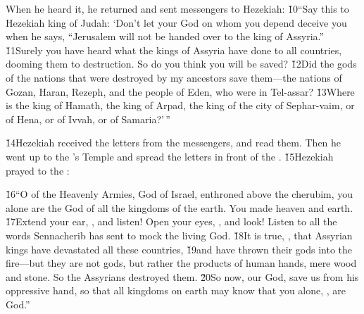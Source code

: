 When he heard it, he returned and sent messengers to Hezekiah: \v{10}``Say this to Hezekiah king of Judah: `Don't let your God on whom you depend deceive you when he says, ``Jerusalem will not be handed over to the king of Assyria.'' \v{11}Surely you have heard what the kings of Assyria have done to all countries, dooming them to destruction. So do you think you will be saved? \v{12}Did the gods of the nations that were destroyed by my ancestors save them---the nations of Gozan, Haran, Rezeph, and the people of Eden, who were in Tel-assar? \v{13}Where is the king of Hamath, the king of Arpad, the king of the city of Sephar-vaim, or of Hena, or of Ivvah, or of Samaria?'\,''

\v{14}Hezekiah received the letters from the messengers, and read them. Then he went up to the 's Temple and spread the letters in front of the . \v{15}Hezekiah prayed to the :

\begin{poetry}
\poeml \v{16}``O  of the Heavenly Armies, God of Israel, enthroned above the cherubim, you alone are the God of all the kingdoms of the earth. You made heaven and earth. \v{17}Extend your ear, , and listen! Open your eyes, , and look! Listen to all the words Sennacherib has sent to mock the living God. \v{18}It is true, , that Assyrian kings have devastated all these countries, \v{19}and have thrown their gods into the fire---but they are not gods, but rather the products of human hands, mere wood and stone. So the Assyrians destroyed them. \v{20}So now,  our God, save us from his oppressive hand, so that all kingdoms on earth may know that you alone, , are God.''
\end{poetry}

